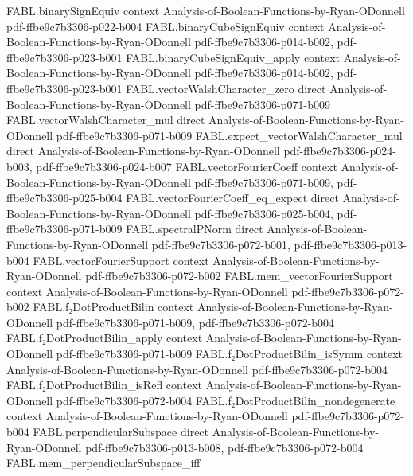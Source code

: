 \begin{theorem}
\proofstep
  {FABL.binarySignEquiv}
  {context}
  {Analysis-of-Boolean-Functions-by-Ryan-ODonnell}
  {pdf-ffbe9c7b3306-p022-b004}
\proofstep
  {FABL.binaryCubeSignEquiv}
  {context}
  {Analysis-of-Boolean-Functions-by-Ryan-ODonnell}
  {pdf-ffbe9c7b3306-p014-b002,
    pdf-ffbe9c7b3306-p023-b001}
\proofstep
  {FABL.binaryCubeSignEquiv_apply}
  {context}
  {Analysis-of-Boolean-Functions-by-Ryan-ODonnell}
  {pdf-ffbe9c7b3306-p014-b002,
    pdf-ffbe9c7b3306-p023-b001}
\proofstep
  {FABL.vectorWalshCharacter_zero}
  {direct}
  {Analysis-of-Boolean-Functions-by-Ryan-ODonnell}
  {pdf-ffbe9c7b3306-p071-b009}
\proofstep
  {FABL.vectorWalshCharacter_mul}
  {direct}
  {Analysis-of-Boolean-Functions-by-Ryan-ODonnell}
  {pdf-ffbe9c7b3306-p071-b009}
\proofstep
  {FABL.expect_vectorWalshCharacter_mul}
  {direct}
  {Analysis-of-Boolean-Functions-by-Ryan-ODonnell}
  {pdf-ffbe9c7b3306-p024-b003,
    pdf-ffbe9c7b3306-p024-b007}
\proofstep
  {FABL.vectorFourierCoeff}
  {context}
  {Analysis-of-Boolean-Functions-by-Ryan-ODonnell}
  {pdf-ffbe9c7b3306-p071-b009,
    pdf-ffbe9c7b3306-p025-b004}
\proofstep
  {FABL.vectorFourierCoeff_eq_expect}
  {direct}
  {Analysis-of-Boolean-Functions-by-Ryan-ODonnell}
  {pdf-ffbe9c7b3306-p025-b004,
    pdf-ffbe9c7b3306-p071-b009}
\proofstep
  {FABL.spectralPNorm}
  {direct}
  {Analysis-of-Boolean-Functions-by-Ryan-ODonnell}
  {pdf-ffbe9c7b3306-p072-b001,
    pdf-ffbe9c7b3306-p013-b004}
\proofstep
  {FABL.vectorFourierSupport}
  {context}
  {Analysis-of-Boolean-Functions-by-Ryan-ODonnell}
  {pdf-ffbe9c7b3306-p072-b002}
\proofstep
  {FABL.mem_vectorFourierSupport}
  {context}
  {Analysis-of-Boolean-Functions-by-Ryan-ODonnell}
  {pdf-ffbe9c7b3306-p072-b002}
\proofstep
  {FABL.f₂DotProductBilin}
  {context}
  {Analysis-of-Boolean-Functions-by-Ryan-ODonnell}
  {pdf-ffbe9c7b3306-p071-b009,
    pdf-ffbe9c7b3306-p072-b004}
\proofstep
  {FABL.f₂DotProductBilin_apply}
  {context}
  {Analysis-of-Boolean-Functions-by-Ryan-ODonnell}
  {pdf-ffbe9c7b3306-p071-b009}
\proofstep
  {FABL.f₂DotProductBilin_isSymm}
  {context}
  {Analysis-of-Boolean-Functions-by-Ryan-ODonnell}
  {pdf-ffbe9c7b3306-p072-b004}
\proofstep
  {FABL.f₂DotProductBilin_isRefl}
  {context}
  {Analysis-of-Boolean-Functions-by-Ryan-ODonnell}
  {pdf-ffbe9c7b3306-p072-b004}
\proofstep
  {FABL.f₂DotProductBilin_nondegenerate}
  {context}
  {Analysis-of-Boolean-Functions-by-Ryan-ODonnell}
  {pdf-ffbe9c7b3306-p072-b004}
\proofstep
  {FABL.perpendicularSubspace}
  {direct}
  {Analysis-of-Boolean-Functions-by-Ryan-ODonnell}
  {pdf-ffbe9c7b3306-p013-b008,
    pdf-ffbe9c7b3306-p072-b004}
\proofstep
  {FABL.mem_perpendicularSubspace_iff}

\end{theorem}
